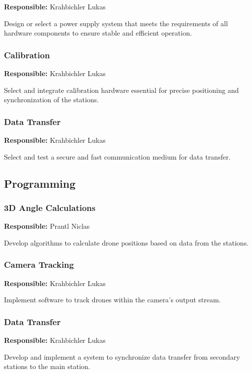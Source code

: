 \textbf{Responsible:} Krahbichler Lukas

Design or select a power supply system that meets the requirements of all hardware components to ensure stable and efficient operation.

\subsubsection{Calibration}

\textbf{Responsible:} Krahbichler Lukas

Select and integrate calibration hardware essential for precise positioning and synchronization of the stations.

\subsubsection{Data Transfer}

\textbf{Responsible:} Krahbichler Lukas

Select and test a secure and fast communication medium for data transfer.

\subsection{Programming}

\subsubsection{3D Angle Calculations}

\textbf{Responsible:} Prantl Niclas

Develop algorithms to calculate drone positions based on data from the stations.

\subsubsection{Camera Tracking}

\textbf{Responsible:} Krahbichler Lukas

Implement software to track drones within the camera's output stream.

\subsubsection{Data Transfer}

\textbf{Responsible:} Krahbichler Lukas

Develop and implement a system to synchronize data transfer from secondary stations to the main station.

